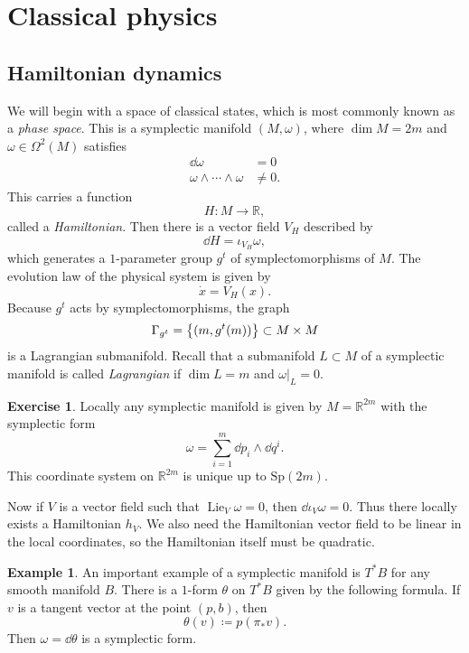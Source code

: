 \documentclass[leqno, openany]{memoir}
\theoremstyle{definition}
\newtheorem{exm}[thm]{Example}
\newtheorem{exer}[thm]{Exercise}
\theoremstyle{remark}
\theoremstyle{plain}
\theoremstyle{definition}
\theoremstyle{remark}
\newcommand{\R}{\mathbb{R}}
\newcommand{\mr}[1]{\mathrm{#1}}
\newcommand{\on}[1]{\operatorname{#1}}
\begin{document}
\section{Classical physics}
\label{sec:classical}

\subsection{Hamiltonian dynamics}
\label{subsec:hamiltonian}

We will begin with a space of classical states, which is most commonly known as a \textit{phase space}. This is a symplectic manifold $(M, \omega)$, where $\dim M = 2m$ and $\omega \in \Omega^2(M)$ satisfies
\begin{align*}
  \dd{\omega} &= 0 \\
  \omega \wedge \cdots \wedge \omega &\neq 0.
\end{align*}
This carries a function
\[ H \colon M \to \R, \]
called a \textit{Hamiltonian}. Then there is a vector field $V_H$ described by
\[ \dd{H} = \iota_{V_H} \omega, \]
which generates a $1$-parameter group $g^t$ of symplectomorphisms of $M$. The evolution law of the physical system is given by
\[ \dot{x} = V_H(x). \]
Because $g^t$ acts by symplectomorphisms, the graph
\[ \Gamma_{g^t} = \qty{(m, g^t(m))} \subset M \times M \]
is a Lagrangian submanifold. Recall that a submanifold $L \subset M$ of a symplectic manifold is called \textit{Lagrangian} if $\dim L = m$ and $\omega |_L = 0$.

\begin{exer}
  Locally any symplectic manifold is given by $M = \R^{2m}$ with the symplectic form
  \[ \omega = \sum_{i=1}^m \dd{p_i} \wedge \dd{q^i}. \]
  This coordinate system on $\R^{2m}$ is unique up to $\mr{Sp}(2m)$.
\end{exer}

Now if $V$ is a vector field such that $\on{Lie}_V \omega = 0$, then $\dd{\iota_V \omega} = 0$. Thus there locally exists a Hamiltonian $h_V$. We also need the Hamiltonian vector field to be linear in the local coordinates, so the Hamiltonian itself must be quadratic.

\begin{exm}
  An important example of a symplectic manifold is $T^* B$ for any smooth manifold $B$. There is a $1$-form $\theta$ on $T^* B$ given by the following formula. If $v$ is a tangent vector at the point $(p,b)$, then
  \[ \theta(v) \coloneqq p(\pi_* v). \]
  Then $\omega = \dd{\theta}$ is a symplectic form.
\end{exm}
\end{document}
